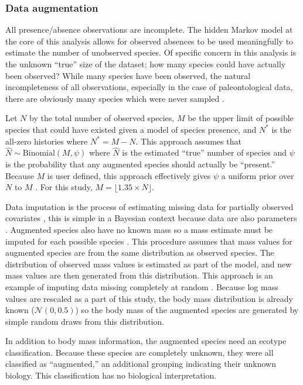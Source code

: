 \documentclass[12pt,letterpaper]{article}
\begin{document}
\subsubsection*{Data augmentation}
All presence/absence observations are incomplete. The hidden Markov model at the core of this analysis allows for observed absences to be used meaningfully to estimate the number of unobserved species. Of specific concern in this analysis is the unknown ``true'' size of the dataset; how many species could have actually been observed? While many species have been observed, the natural incompleteness of all observations, especially in the case of paleontological data, there are obviously many species which were never sampled \citep{Royle2008,Royle2007a}.

Let \(N\) by the total number of observed species, \(M\) be the upper limit of possible species that could have existed given a model of species presence, and \(N^{\ast}\) is the all-zero histories where \(N^{\ast} = M - N\). This approach assumes that \(\hat{N} \sim \text{Binomial}(M, \psi)\) where \(\hat{N}\) is the estimated ``true'' number of species and \(\psi\) is the probability that any augmented species should actually be ``present.'' Because \(M\) is user defined, this approach effectively gives \(\psi\) a uniform prior over \(N\) to \(M\) \citep{Royle2008}. For this study, \(M = \lfloor{1.35 \times N\rfloor}\).

Data imputation is the process of estimating missing data for partially observed covariates \citep{Gelman2007,Rubin1996}, this is simple in a Bayesian context because data are also parameters \citep{Gelman2013d}. Augmented species also have no known mass so a mass estimate must be imputed for each possible species \citep{Royle2012b}. This procedure assumes that mass values for augmented species are from the same distribution as observed species. The distribution of observed mass values is estimated as part of the model, and new mass values are then generated from this distribution. This approach is an example of imputing data missing completely at random \citep{Gelman2007,Royle2012b}. Because log mass values are rescaled as a part of this study, the body mass distribution is already known (\(\mathcal{N}(0, 0.5)\)) so the body mass of the augmented species are generated by simple random draws from this distribution. 

In addition to body mass information, the augmented species need an ecotype classification. Because these species are completely unknown, they were all classified as ``augmented,'' an additional grouping indicating their unknown biology. This classification has no biological interpretation.
\end{document}
